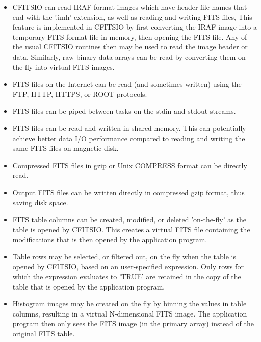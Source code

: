 \documentclass[11pt]{book}
\begin{document}
\begin{itemize}
\item
CFITSIO can read IRAF format images which have header file names that
end with the '.imh' extension, as well as reading and writing FITS
files,   This feature is implemented in CFITSIO by first converting the
IRAF image into a temporary FITS format file in memory, then opening
the FITS file.  Any of the usual CFITSIO routines then may be used to
read the image header or data.  Similarly, raw binary data arrays can
be read by converting them on the fly into virtual FITS images.

\item
FITS files on the Internet can be read (and sometimes written) using the FTP,
HTTP, HTTPS, or ROOT protocols.

\item
FITS files can be piped between tasks on the stdin and stdout streams.

\item
FITS files can be read and written in shared memory.  This can
potentially achieve better data I/O performance compared to reading and
writing the same FITS files on magnetic disk.

\item
Compressed FITS files in gzip or Unix COMPRESS format can be directly read.

\item
Output FITS files can be written directly in compressed gzip format,
thus saving disk space.

\item
FITS table columns can be created, modified, or deleted 'on-the-fly' as
the table is opened by CFITSIO.  This creates a virtual FITS file containing
the modifications that is then opened by the application program.

\item
Table rows may be selected, or filtered out, on the fly when the table
is opened by CFITSIO, based on an user-specified expression.
Only rows for which the expression evaluates to 'TRUE' are retained
in the copy of the table that is opened by the application program.

\item
Histogram images may be created on the fly by binning the values in
table columns, resulting in a virtual N-dimensional FITS image.  The
application program then only sees the FITS image (in the primary
array) instead of the original FITS table.
\end{itemize}
\end{document}
